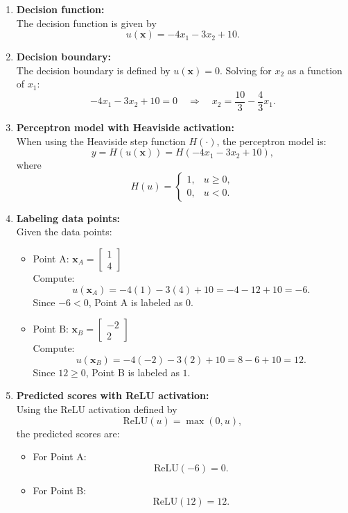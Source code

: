 \documentclass[12pt]{article}
\begin{document}
\begin{enumerate}[label=(\alph*)]
    \item \textbf{Decision function:} \\
    The decision function is given by
    \[
    u(\bm{x}) = -4x_1 - 3x_2 + 10.
    \]
    
    \item \textbf{Decision boundary:} \\
    The decision boundary is defined by \( u(\bm{x})=0 \). Solving for \(x_2\) as a function of \(x_1\):
    \[
    -4x_1 - 3x_2 + 10 = 0 \quad \Longrightarrow \quad x_2 = \frac{10}{3} - \frac{4}{3}x_1.
    \]
    
    \item \textbf{Perceptron model with Heaviside activation:} \\
    When using the Heaviside step function \(H(\cdot)\), the perceptron model is:
    \[
    y = H(u(\bm{x})) = H(-4x_1 - 3x_2 + 10),
    \]
    where
    \[
    H(u) = \begin{cases} 1, & u \ge 0, \\ 0, & u < 0. \end{cases}
    \]
    
    \item \textbf{Labeling data points:} \\
    Given the data points:
    \begin{itemize}
        \item Point A: \(\bm{x}_A = \begin{bmatrix} 1 \\ 4 \end{bmatrix}\) \\
        Compute:
        \[
        u(\bm{x}_A) = -4(1) - 3(4) + 10 = -4 - 12 + 10 = -6.
        \]
        Since \(-6 < 0\), Point A is labeled as \(0\).
        
        \item Point B: \(\bm{x}_B = \begin{bmatrix} -2 \\ 2 \end{bmatrix}\) \\
        Compute:
        \[
        u(\bm{x}_B) = -4(-2) - 3(2) + 10 = 8 - 6 + 10 = 12.
        \]
        Since \(12 \ge 0\), Point B is labeled as \(1\).
    \end{itemize}
    
    \item \textbf{Predicted scores with ReLU activation:} \\
    Using the ReLU activation defined by
    \[
    \text{ReLU}(u) = \max(0,u),
    \]
    the predicted scores are:
    \begin{itemize}
        \item For Point A:
        \[
        \text{ReLU}(-6) = 0.
        \]
        \item For Point B:
        \[
        \text{ReLU}(12) = 12.
        \]
    \end{itemize}
\end{enumerate}
\end{document}

